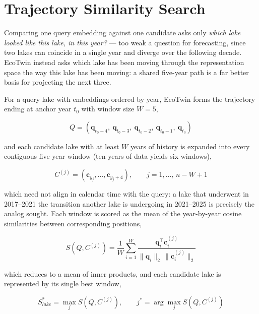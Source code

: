 \documentclass[12pt,a4paper,oneside]{report}
\begin{document}
\section{Trajectory Similarity Search}
\label{sec:trajectory}

Comparing one query embedding against one candidate asks only
\emph{which lake looked like this lake, in this year?} --- too weak
a question for forecasting, since two lakes can coincide in a single
year and diverge over the following decade. EcoTwin instead asks
which lake has been moving through the representation space the way
this lake has been moving: a shared five-year path is a far better
basis for projecting the next three.

For a query lake with embeddings ordered by year, EcoTwin forms the
trajectory ending at anchor year $t_0$ with window size $W=5$,

\begin{equation}
Q = \left(\mathbf{q}_{t_0-4},\ \mathbf{q}_{t_0-3},\
\mathbf{q}_{t_0-2},\ \mathbf{q}_{t_0-1},\ \mathbf{q}_{t_0}\right)
\end{equation}

and each candidate lake with at least $W$ years of history is
expanded into every contiguous five-year window (ten years of data
yields six windows),

\begin{equation}
C^{(j)} = \left(\mathbf{c}_{y_j},\dots,\mathbf{c}_{y_j+4}\right),
\qquad j = 1,\dots,\,n-W+1
\end{equation}

which need not align in calendar time with the query: a lake that
underwent in 2017--2021 the transition another lake is undergoing in
2021--2025 is precisely the analog sought. Each window is scored as
the mean of the year-by-year cosine similarities between
corresponding positions,

\begin{equation}
S\!\left(Q, C^{(j)}\right)
=
\frac{1}{W}
\sum_{i=1}^{W}
\frac{\mathbf{q}_i^{\top}\mathbf{c}^{(j)}_i}
{\|\mathbf{q}_i\|_2\,\|\mathbf{c}^{(j)}_i\|_2}
\end{equation}

which reduces to a mean of inner products, and each candidate lake is
represented by its single best window,

\begin{equation}
S^{*}_{lake} = \max_{j} S\!\left(Q, C^{(j)}\right),
\qquad
j^{*} = \arg\max_{j} S\!\left(Q, C^{(j)}\right)
\end{equation}
\end{document}
